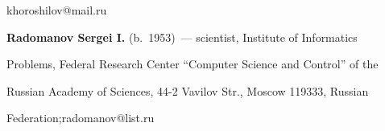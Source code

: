 khoroshilov@mail.ru


\vspace*{3pt}





\noindent


\textbf{Radomanov Sergei I.} (b.\ 1953)~--- scientist, Institute of Informatics 


Problems, Federal Research Center ``Computer Science and Control'' of the 


Russian Academy of Sciences, 44-2 Vavilov Str., Moscow 119333, Russian 


Federation;\linebreak radomanov@list.ru





    


    


\label{end\stat}








\renewcommand{\bibname}{\protect\rm Литература}


    


